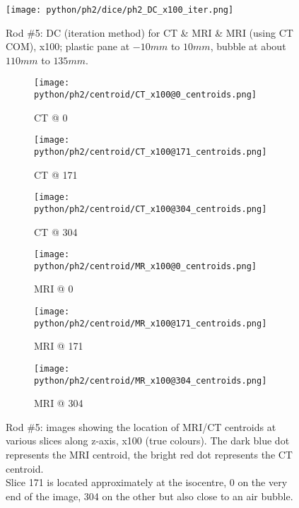 \begin{figure}[!bth]
    \centering
    \texttt{[image: python/ph2/dice/ph2\_DC\_x100\_iter.png]}
    \caption[Rod \#5: DC (iteration method) for CT \& MRI \& MRI (using CT COM), x100.]{Rod \#5: DC (iteration method) for CT \& MRI \& MRI (using CT COM), x100; plastic pane at $-10mm$ to $10mm$, bubble at about $110mm$ to $135mm$.}
    \label{fig:ph2_DC_x100}
\end{figure}


\begin{figure}[!tbp]
  \begin{subfigure}[b]{0.32\textwidth}
    \texttt{[image: python/ph2/centroid/CT\_x100@0\_centroids.png]}
    \caption{CT @ 0}
    \label{fig:CT_x100_centroids@0}
  \end{subfigure}
  \begin{subfigure}[b]{0.32\textwidth}
    \texttt{[image: python/ph2/centroid/CT\_x100@171\_centroids.png]}
    \caption{CT @ 171}
    \label{fig:CT_x100_centroids@171}
  \end{subfigure}
  \begin{subfigure}[b]{0.32\textwidth}
    \texttt{[image: python/ph2/centroid/CT\_x100@304\_centroids.png]}
    \caption{CT @ 304}
    \label{fig:CT_x100_centroids@304}
  \end{subfigure}
  \begin{subfigure}[b]{0.32\textwidth}
    \texttt{[image: python/ph2/centroid/MR\_x100@0\_centroids.png]}
    \caption{MRI @ 0}
    \label{fig:MR_x100_centroids@0}
  \end{subfigure}
  \begin{subfigure}[b]{0.32\textwidth}
    \texttt{[image: python/ph2/centroid/MR\_x100@171\_centroids.png]}
    \caption{MRI @ 171}
    \label{fig:MR_x100_centroids@171}
  \end{subfigure}
  \begin{subfigure}[b]{0.32\textwidth}
    \texttt{[image: python/ph2/centroid/MR\_x100@304\_centroids.png]}
    \caption{MRI @ 304}
    \label{fig:MR_x100_centroids@304}
  \end{subfigure}
  \caption[Rod \#5: images showing the location of MRI/CT centroids at various slices along z-axis, x100.]{Rod \#5: images showing the location of MRI/CT centroids at various slices along z-axis, x100 (true colours). The dark blue dot represents the MRI centroid, the bright red dot represents the CT centroid.
  			\\ Slice 171 is located approximately at the isocentre, 0 on the very end of the image, 304 on the other but also close to an air bubble.}
  \label{fig:MR_x100_centroids}
\end{figure}

